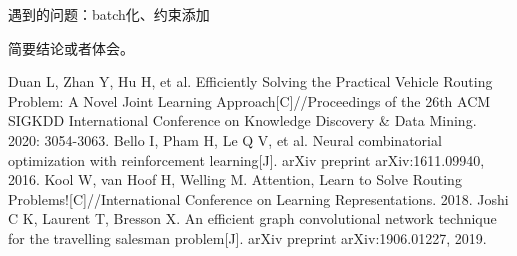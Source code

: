 \documentclass[withoutpreface,bwprint]{cumcmthesis} %
\begin{document}
	遇到的问题：batch化、约束添加 %
	
   简要结论或者体会。

%
\begin{thebibliography}{99}
	 Duan L, Zhan Y, Hu H, et al. Efficiently Solving the Practical Vehicle Routing Problem: A Novel Joint Learning Approach[C]//Proceedings of the 26th ACM SIGKDD International Conference on Knowledge Discovery \& Data Mining. 2020: 3054-3063.
	 Bello I, Pham H, Le Q V, et al. Neural combinatorial optimization with reinforcement learning[J]. arXiv preprint arXiv:1611.09940, 2016.
	 Kool W, van Hoof H, Welling M. Attention, Learn to Solve Routing Problems![C]//International Conference on Learning Representations. 2018.
	 Joshi C K, Laurent T, Bresson X. An efficient graph convolutional network technique for the travelling salesman problem[J]. arXiv preprint arXiv:1906.01227, 2019.
	

\end{thebibliography}
\end{document}

